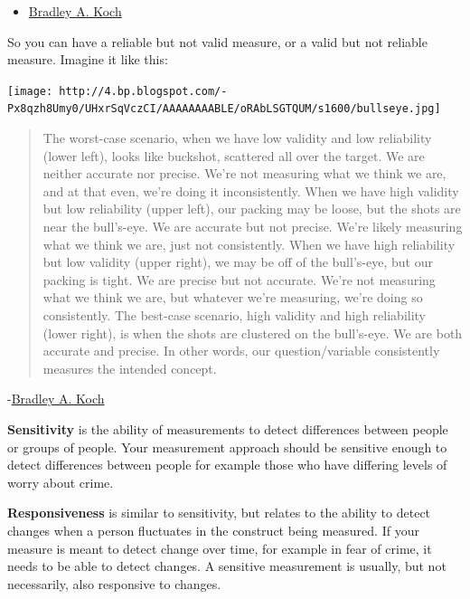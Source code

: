 \documentclass[]{book}
\providecommand{\tightlist}{%
  \setlength{\itemsep}{0pt}\setlength{\parskip}{0pt}}
\theoremstyle{definition}
\theoremstyle{definition}
\theoremstyle{definition}
\theoremstyle{remark}
\begin{document}
\begin{itemize}
\tightlist
\item
  \href{http://www.socingoutloud.com/2012/10/teaching-validity-and-reliability-in.html}{Bradley
  A. Koch}
\end{itemize}

So you can have a reliable but not valid measure, or a valid but not
reliable measure. Imagine it like this:

\texttt{[image: http://4.bp.blogspot.com/-Px8qzh8Umy0/UHxrSqVczCI/AAAAAAAABLE/oRAbLSGTQUM/s1600/bullseye.jpg]}

\begin{quote}
The worst-case scenario, when we have low validity and low reliability
(lower left), looks like buckshot, scattered all over the target. We are
neither accurate nor precise. We're not measuring what we think we are,
and at that even, we're doing it inconsistently. When we have high
validity but low reliability (upper left), our packing may be loose, but
the shots are near the bull's-eye. We are accurate but not precise.
We're likely measuring what we think we are, just not consistently. When
we have high reliability but low validity (upper right), we may be off
of the bull's-eye, but our packing is tight. We are precise but not
accurate. We're not measuring what we think we are, but whatever we're
measuring, we're doing so consistently. The best-case scenario, high
validity and high reliability (lower right), is when the shots are
clustered on the bull's-eye. We are both accurate and precise. In other
words, our question/variable consistently measures the intended concept.
\end{quote}

-\href{http://www.socingoutloud.com/2012/10/teaching-validity-and-reliability-in.html}{Bradley
A. Koch}

\textbf{Sensitivity} is the ability of measurements to detect
differences between people or groups of people. Your measurement
approach should be sensitive enough to detect differences between people
for example those who have differing levels of worry about crime.

\textbf{Responsiveness} is similar to sensitivity, but relates to the
ability to detect changes when a person fluctuates in the construct
being measured. If your measure is meant to detect change over time, for
example in fear of crime, it needs to be able to detect changes. A
sensitive measurement is usually, but not necessarily, also responsive
to changes.
\end{document}
